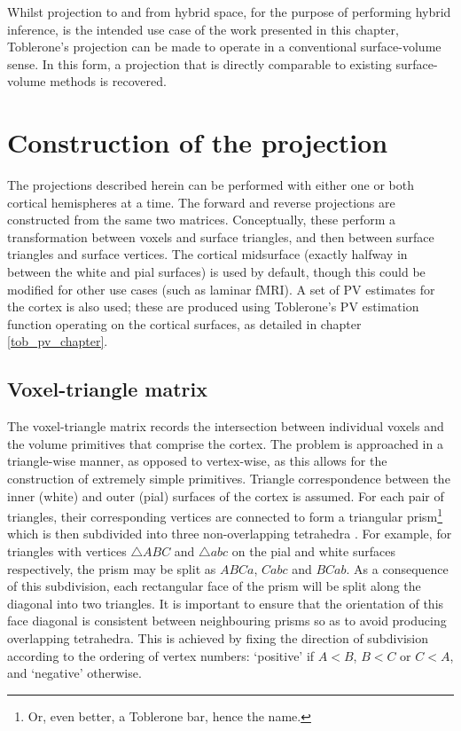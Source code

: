 \documentclass[12pt]{report}
\begin{document}
Whilst projection to and from hybrid space, for the purpose of performing hybrid inference, is the intended use case of the work presented in this chapter, Toblerone's projection can be made to operate in a conventional surface-volume sense. In this form, a projection that is directly comparable to existing surface-volume methods is recovered. 

\section{Construction of the projection}

The projections described herein can be performed with either one or both cortical hemispheres at a time. The forward and reverse projections are constructed from the same two matrices. Conceptually, these perform a transformation between voxels and surface triangles, and then between surface triangles and surface vertices. The cortical midsurface (exactly halfway in between the white and pial surfaces) is used by default, though this could be modified for other use cases (such as laminar fMRI). A set of PV estimates for the cortex is also used; these are produced using Toblerone's PV estimation function operating on the cortical surfaces, as detailed in chapter \ref{tob_pv_chapter}.

\subsection{Voxel-triangle matrix}
The voxel-triangle matrix records the intersection between individual voxels and the volume primitives that comprise the cortex. The problem is approached in a triangle-wise manner, as opposed to vertex-wise, as this allows for the construction of extremely simple primitives. Triangle correspondence between the inner (white) and outer (pial) surfaces of the cortex is assumed. For each pair of triangles, their corresponding vertices are connected to form a triangular prism\footnote{Or, even better, a Toblerone bar, hence the name.} which is then subdivided into three non-overlapping tetrahedra \cite{Dompierre1999}. For example, for triangles with vertices $\triangle ABC$ and $\triangle abc$ on the pial and white surfaces respectively, the prism may be split as $ABCa$, $Cabc$ and $BCab$. As a consequence of this subdivision, each rectangular face of the prism will be split along the diagonal into two triangles. It is important to ensure that the orientation of this face diagonal is consistent between neighbouring prisms so as to avoid producing overlapping tetrahedra. This is achieved by fixing the direction of subdivision according to the ordering of vertex numbers: `positive' if $A < B$, $B < C$ or $C < A$, and `negative' otherwise. 
\end{document}
